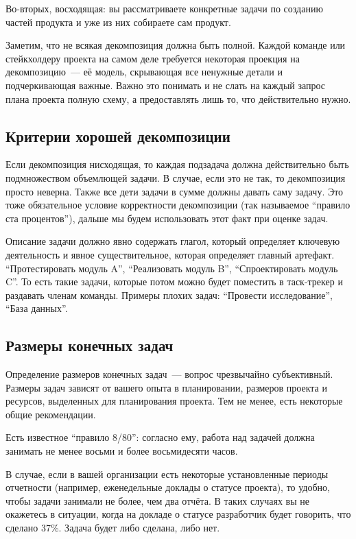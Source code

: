 \documentclass{../../text-style}
\begin{document}
Во-вторых, восходящая: вы рассматриваете конкретные задачи по созданию частей продукта и уже из них собираете сам продукт.

Заметим, что не всякая декомпозиция должна быть полной. Каждой команде или стейкхолдеру проекта на самом деле требуется некоторая проекция на декомпозицию~--- её модель, скрывающая все ненужные детали и подчеркивающая важные. Важно это понимать и не слать на каждый запрос плана проекта полную схему, а предоставлять лишь то, что действительно нужно.

\subsection{Критерии хорошей декомпозиции}

Если декомпозиция нисходящая, то каждая подзадача должна действительно быть подмножеством объемлющей задачи. В случае, если это не так, то декомпозиция просто неверна. Также все дети задачи в сумме должны давать саму задачу. Это тоже обязательное условие корректности декомпозиции (так называемое \enquote{правило ста процентов}), дальше мы будем использовать этот факт при оценке задач.

Описание задачи должно явно содержать глагол, который определяет ключевую деятельность и явное существительное, которая определяет главный артефакт. \enquote{Протестировать модуль A}, \enquote{Реализовать модуль B}, \enquote{Спроектировать модуль C}. То есть такие задачи, которые потом можно будет поместить в таск-трекер и раздавать членам команды. Примеры плохих задач: \enquote{Провести исследование}, \enquote{База данных}.

\subsection{Размеры конечных задач}

Определение размеров конечных задач~--- вопрос чрезвычайно субъективный. Размеры задач зависят от вашего опыта в планировании, размеров проекта и ресурсов, выделенных для планирования проекта. Тем не менее, есть некоторые общие рекомендации.

Есть известное \enquote{правило 8/80}: согласно ему, работа над задачей должна занимать не менее восьми и более восьмидесяти часов.

В случае, если в вашей организации есть некоторые установленные периоды отчетности (например, еженедельные доклады о статусе проекта), то удобно, чтобы задачи занимали не более, чем два отчёта. В таких случаях вы не окажетесь в ситуации, когда на докладе о статусе разработчик будет говорить, что сделано 37\%. Задача будет либо сделана, либо нет.
\end{document}
